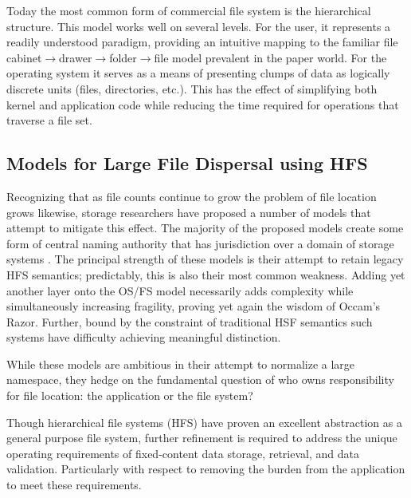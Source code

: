 Today the most common form of commercial file system is the hierarchical
structure. This model works well on several levels. For the user, it
represents a readily understood paradigm, providing an intuitive mapping
to the familiar file cabinet\(\rightarrow\)drawer\(\rightarrow\)folder\(\rightarrow\)file model prevalent in the
paper world. For the operating system it serves as a means of presenting
clumps of data as logically discrete units (files, directories, etc.).
This has the effect of simplifying both kernel and application code
while reducing the time required for operations that traverse a file
set.

\subsection{Models for Large File Dispersal using
HFS}

Recognizing that as file counts continue to grow the problem of file
location grows likewise, storage researchers have proposed a number of
models that attempt to mitigate this effect. The majority of the
proposed models create some form of central naming authority that has
jurisdiction over a domain of storage systems \cite{ref11,ref12,ref13,ref14}. The principal
strength of these models is their attempt to retain legacy HFS
semantics; predictably, this is also their most common weakness. Adding
yet another layer onto the OS/FS model necessarily adds complexity while
simultaneously increasing fragility, proving yet again the wisdom of
Occam's Razor. Further, bound by the constraint of traditional HSF
semantics such systems have difficulty achieving meaningful distinction.

While these models are ambitious in their attempt to normalize a large
namespace, they hedge on the fundamental question of who owns
responsibility for file location: the application or the file system?

Though hierarchical file systems (HFS) have proven an excellent
abstraction as a general purpose file system, further refinement is
required to address the unique operating requirements of fixed-content
data storage, retrieval, and data validation. Particularly with respect
to removing the burden from the application to meet these requirements.
